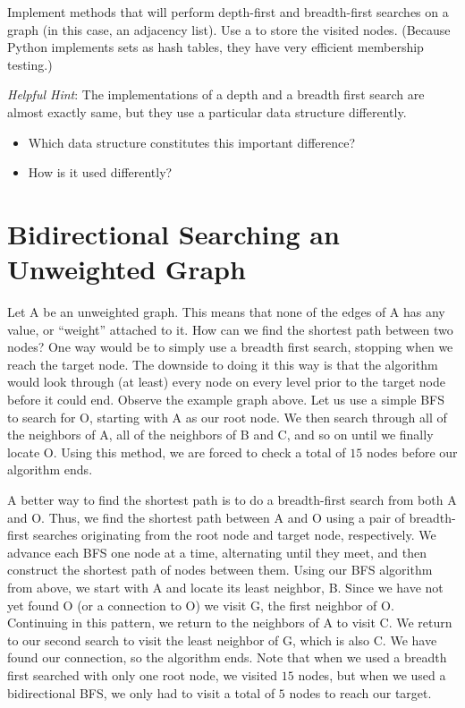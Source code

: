 \begin{problem}
Implement methods that will perform depth-first and breadth-first searches on a graph (in this case, an adjacency list).
Use a  to store the visited nodes. (Because Python implements sets as hash tables, they have very efficient membership testing.)

\emph{Helpful Hint}: The implementations of a depth and a breadth first search
are almost exactly same, but they use a particular data structure differently.
\begin{itemize}
\item Which data structure constitutes this important difference?
\item How is it used differently?
\end{itemize}
\end{problem}

\section*{Bidirectional Searching an Unweighted Graph}

Let A be an unweighted graph. This means that none of the edges of A has any value, or ``weight'' attached to it. How can we find the shortest path between two nodes?
One way would be to simply use a breadth first search, stopping when we reach the target node. The downside to doing it this way is that the algorithm would look through (at least)
every node on every level prior to the target node before it could end. Observe the example graph above. Let us use a simple BFS to search for O, starting with A as our root node.
We then search through all of the neighbors of A, all of the neighbors of B and C, and so on until we finally locate O. Using this method, we are forced to check
a total of $15$ nodes before our algorithm ends.

A better way to find the shortest path is to do a breadth-first search from both A and O. Thus, we find the shortest path between A and O using a pair of breadth-first searches originating from the root node and target node, respectively.
We advance each BFS one node at a time, alternating until they meet, and then construct the shortest path of nodes between them.
 Using our BFS algorithm from above, we start with A and locate its
least neighbor, B. Since we have not yet found O (or a connection to O) we visit G, the first neighbor of O. Continuing in this pattern, we return to the neighbors
of A to visit C. We return to our second search to visit the least neighbor of G, which is also C. We have found our connection, so the algorithm ends. Note that when we used a breadth first
searched with only one root node, we visited $15$ nodes, but when we used a bidirectional BFS, we only had to visit a total of $5$ nodes to reach our target.

